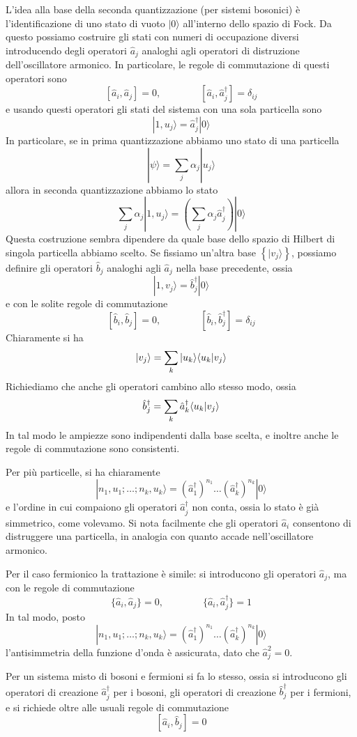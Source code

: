 \documentclass[a4paper, 11pt]{article}
\newcommand{\op}[1]{\hat{#1}}
\renewcommand{\op}[1]{\hat{#1}}
\renewcommand{\ket}[1]{| #1\rangle}
\begin{document}
L'idea alla base della seconda quantizzazione (per sistemi bosonici) è l'identificazione di uno stato di vuoto $\ket0$ all'interno dello spazio di Fock. Da questo possiamo costruire gli stati con numeri di occupazione diversi introducendo degli operatori $\op{a}_j$ analoghi agli operatori di distruzione dell'oscillatore armonico. In particolare, le regole di commutazione di questi operatori sono
\[[\op a_i,\op a_j]=0,\qquad\qquad[\op a_i,\op a_j^\dagger]=\delta_{ij}\]
e usando questi operatori gli stati del sistema con una sola particella sono
\[\ket{1,u_j}=\op a_j^\dagger\ket{0}\]
In particolare, se in prima quantizzazione abbiamo uno stato di una particella
\[\ket{\psi}=\sum_j\alpha_j\ket{u_j}\]
allora in seconda quantizzazione abbiamo lo stato
\[\sum_j\alpha_j\ket{1,u_j}=\left(\sum_j\alpha_j\op{a}_j^\dagger\right)\ket0\]
Questa costruzione sembra dipendere da quale base dello spazio di Hilbert di singola particella abbiamo scelto. Se fissiamo un'altra base $\left\{\ket{v_j}\right\}$, possiamo definire gli operatori $\op b_j$ analoghi agli $\op a_j$ nella base precedente, ossia
\[\ket{1,v_j}=\op b_j^\dagger\ket0\]
e con le solite regole di commutazione
\[[\op b_i,\op b_j]=0,\qquad\qquad[\op b_i,\op b_j^\dagger]=\delta_{ij}\]
Chiaramente si ha
\[\ket{v_j}=\sum_k\ket{u_k}\braket{u_k}{v_j}\]
Richiediamo che anche gli operatori cambino allo stesso modo, ossia
\[\op b_j^\dagger=\sum_k\op a_k^\dagger\braket{u_k}{v_j}\]
In tal modo le ampiezze sono indipendenti dalla base scelta, e inoltre anche le regole di commutazione sono consistenti.

Per più particelle, si ha chiaramente
\[\ket{n_1,u_1;\ldots;n_k,u_k}=(\op a_1^{\dagger})^{n_1}\ldots(\op a_k^\dagger)^{n_k}\ket0\]
e l'ordine in cui compaiono gli operatori $\op a^\dagger_j$ non conta, ossia lo stato è già simmetrico, come volevamo. Si nota facilmente che gli operatori $\op a_i$ consentono di distruggere una particella, in analogia con quanto accade nell'oscillatore armonico.

Per il caso fermionico la trattazione è simile: si introducono gli operatori $\op a_j$, ma con le regole di commutazione
\[\{\op a_i,\op a_j\}=0,\qquad\qquad\{\op a_i,\op a_j^\dagger\}=1\]
In tal modo, posto
\[\ket{n_1,u_1;\ldots;n_k,u_k}=(\op a_1^{\dagger})^{n_1}\ldots(\op a_k^\dagger)^{n_k}\ket0\]
l'antisimmetria della funzione d'onda è assicurata, dato che $\op a_j^2=0$.

Per un sistema misto di bosoni e fermioni si fa lo stesso, ossia si introducono gli operatori di creazione $\op a_j^\dagger$ per i bosoni, gli operatori di creazione $\op b_j^\dagger$ per i fermioni, e si richiede oltre alle usuali regole di commutazione
\[[\op a_i,\op b_j]=0\]
\end{document}
